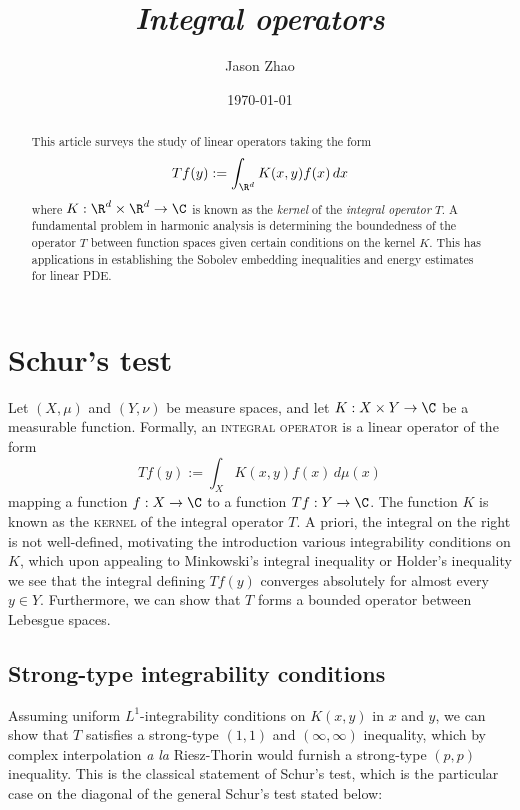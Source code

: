 \documentclass[reqno]{amsart}
\title
{
	\emph{Integral operators}
}
\author{Jason Zhao}
\date{\today}
\theoremstyle{definition}
\theoremstyle{remark}
\newcounter{problem}[section]	\declaretheorem[style=thmrecbox,name=Problem, numberlike=problem]{statement}
\renewcommand{\emph}{\textsc}
\begin{document}
\maketitle

\begin{abstract}
	This article surveys the study of linear operators taking the form 
		\[ Tf(y) := \int_{\R^d} K(x, y) f(x) \, dx \]
	where $K : \R^d \times \R^d \to \C$ is known as the \textit{kernel} of the \textit{integral operator} $T$. A fundamental problem in harmonic analysis is determining the boundedness of the operator $T$ between function spaces given certain conditions on the kernel $K$. This has applications in establishing the Sobolev embedding inequalities and energy estimates for linear PDE.  
\end{abstract}

\tableofcontents

\section{Schur's test}

Let $(X, \mu)$ and $(Y, \nu)$ be measure spaces, and let $K : X \times Y \to \C$ be a measurable function. Formally, an \emph{integral operator} is a linear operator of the form
	\[ Tf(y) := \int_X K(x, y) f(x) \, d\mu (x) \]
mapping a function $f: X \to \C$ to a function $Tf : Y \to \C$. The function $K$ is known as the \emph{kernel} of the integral operator $T$. A priori, the integral on the right is not well-defined, motivating the introduction various integrability conditions on $K$, which upon appealing to Minkowski's integral inequality or Holder's inequality we see that the integral defining $Tf(y)$ converges absolutely for almost every $y \in Y$. Furthermore, we can show that $T$ forms a bounded operator between Lebesgue spaces.

\subsection{Strong-type integrability conditions}

Assuming uniform $L^1$-integrability conditions on $K(x, y)$ in $x$ and $y$, we can show that $T$ satisfies a strong-type $(1, 1)$ and $(\infty, \infty)$ inequality, which by complex interpolation \textit{a la} Riesz-Thorin would furnish a strong-type $(p, p)$ inequality. This is the classical statement of Schur's test, which is the particular case on the diagonal of the general Schur's test stated below:
\end{document}
